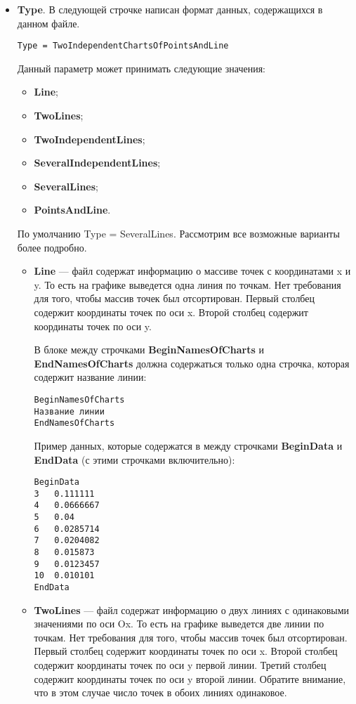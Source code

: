 \documentclass[a4paper,12pt]{article}
\begin{document}
\begin{itemize}
\item \textbf{Type}.
В следующей строчке написан формат данных, содержащихся в данном файле.
\begin{lstlisting}[label=Line03,caption=Строчка с описанием типа данных в файле]
Type = TwoIndependentChartsOfPointsAndLine
\end{lstlisting}
Данный параметр может принимать следующие значения:

\begin{itemize}
\item \textbf{Line};
\item \textbf{TwoLines};
\item \textbf{TwoIndependentLines};
\item \textbf{SeveralIndependentLines};
\item \textbf{SeveralLines};
\item \textbf{PointsAndLine}.
\end{itemize}

По умолчанию Type = SeveralLines. Рассмотрим все возможные варианты более подробно.

\begin{itemize}
\item \textbf{Line} --- файл содержат информацию о массиве точек с координатами x и y. То есть на графике выведется одна линия по точкам. Нет требования для того, чтобы массив точек был отсортирован.  Первый столбец содержит координаты точек по оси x. Второй столбец содержит координаты точек по оси y.

В блоке между строчками \textbf{BeginNamesOfCharts} и \textbf{EndNamesOfCharts} должна содержаться только одна строчка, которая содержит название линии:
\begin{lstlisting}[label=Line03_2,caption=Для Line ]
BeginNamesOfCharts
Название линии
EndNamesOfCharts
\end{lstlisting}

Пример данных, которые содержатся в между строчками \textbf{BeginData} и \textbf{EndData} (с этими строчками включительно):
\begin{lstlisting}[label=Line03_3,caption=Для Line ]
BeginData
3	0.111111
4	0.0666667
5	0.04
6	0.0285714
7	0.0204082
8	0.015873
9	0.0123457
10	0.010101
EndData
\end{lstlisting}

\item \textbf{TwoLines} --- файл содержат информацию о двух линиях с одинаковыми значениями по оси Ox. То есть на графике выведется две линии по точкам. Нет требования для того, чтобы массив точек был отсортирован. Первый столбец содержит координаты точек по оси x. Второй столбец содержит координаты точек по оси y первой линии. Третий столбец содержит координаты точек по оси y второй линии. Обратите внимание, что в этом случае число точек в обоих линиях одинаковое.


\end{itemize}
\end{itemize}
\end{document}
